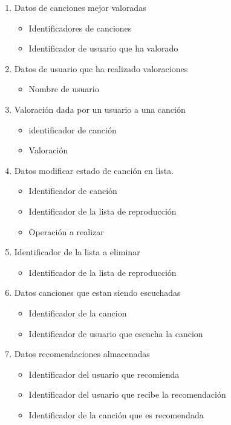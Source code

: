 \documentclass[12pt,a4paper]{article}
\begin{document}
\begin{enumerate}[label=\textnormal{RD\arabic*.}]
\begin{itemize}
		\end{itemize}
	\item Datos de canciones mejor valoradas  \label{rd32}
		\begin{itemize}
			\item Identificadores de canciones
			\item Identificador de usuario que ha valorado
		\end{itemize}
	\item Datos de usuario que ha realizado valoraciones  \label{rd33}
		\begin{itemize}
			\item Nombre de usuario
		\end{itemize}
		
	\item Valoración dada por un usuario a una canción  \label{rd34}
		\begin{itemize}
			\item identificador de canción
			\item Valoración
		\end{itemize}
		
	\item Datos modificar estado de canción en lista.  \label{rd35}
		\begin{itemize}
			\item Identificador de canción
			\item Identificador de la lista de reproducción
			\item Operación a realizar
		\end{itemize}
		
	\item Identificador de la lista a eliminar  \label{rd36}
		\begin{itemize}
			\item Identificador de la lista de reproducción
		\end{itemize}
		
	\item Datos canciones que estan siendo escuchadas  \label{rd37}
		\begin{itemize}
			\item Identificador de la cancion
			\item Identificador de usuario que escucha la cancion
		\end{itemize}
				
	\item Datos recomendaciones almacenadas  \label{rd38}
		\begin{itemize}
			\item Identificador del usuario que recomienda
			\item Identificador del usuario que recibe la recomendación
			\item Identificador de la canción que es recomendada
		\end{itemize}
		

\end{enumerate}
\end{document}
